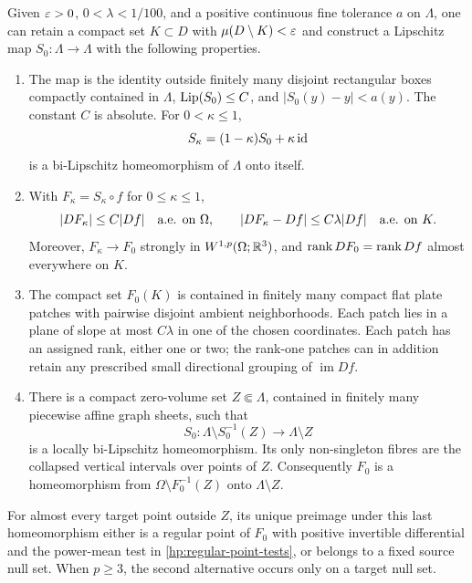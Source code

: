 \begin{proposition}\label{hp:flattening}
Given $\varepsilon>0$, $0<\lambda<1/100$, and a positive continuous fine
tolerance $a$ on $\Lambda$, one can retain a compact set $K\subset D$
with $\mu(D\setminus K)<\varepsilon$ and construct a Lipschitz map
$S_0:\Lambda\to\Lambda$ with the following properties.
\begin{enumerate}
\item The map is the identity outside finitely many disjoint
rectangular boxes compactly contained in $\Lambda$,
$\operatorname{Lip}(S_0)\le C$, and $|S_0(y)-y|<a(y)$.  The constant $C$ is
absolute.  For $0<\kappa\le1$,
\[
 S_\kappa=(1-\kappa)S_0+\kappa\operatorname{id}
\]
is a bi-Lipschitz homeomorphism of $\Lambda$ onto itself.
\item With $F_\kappa=S_\kappa\circ f$ for $0\le\kappa\le1$,
\begin{equation}\label{hp:flattening-derivative}
 |DF_\kappa|\le C|Df|\quad\hbox{a.e. on }\Omega,
 \qquad
 |DF_\kappa-Df|\le C\lambda|Df|
                   \quad\hbox{a.e. on }K.
\end{equation}
Moreover, $F_\kappa\to F_0$ strongly in $W^{1,p}(\Omega;\mathbb R^3)$,
and $\operatorname{rank} DF_0=\operatorname{rank} Df$ almost everywhere on $K$.
\item The compact set $F_0(K)$ is contained in finitely many compact
flat plate patches with pairwise disjoint ambient neighborhoods.
Each patch lies in a plane of slope at most $C\lambda$ in one of
the chosen coordinates.  Each patch has an assigned rank, either
one or two; the rank-one patches can in addition retain any prescribed
small directional grouping of $\operatorname{im}Df$.
\item There is a compact zero-volume set $Z\Subset\Lambda$,
contained in finitely many piecewise affine graph sheets, such that
\begin{equation}\label{hp:flattening-homeomorphic-complement}
 S_0:\Lambda\setminus S_0^{-1}(Z)\longrightarrow\Lambda\setminus Z
\end{equation}
is a locally bi-Lipschitz homeomorphism.  Its only non-singleton
fibres are the collapsed vertical intervals over points of $Z$.
Consequently $F_0$ is a homeomorphism from
$\Omega\setminus F_0^{-1}(Z)$ onto $\Lambda\setminus Z$.
\end{enumerate}
For almost every target point outside $Z$, its unique preimage under
this last homeomorphism either is a regular point of $F_0$ with
positive invertible differential and the power-mean test in
\eqref{hp:regular-point-tests}, or belongs to a fixed source null set.
When $p\ge3$, the second alternative occurs only on a target null
set.
\end{proposition}

